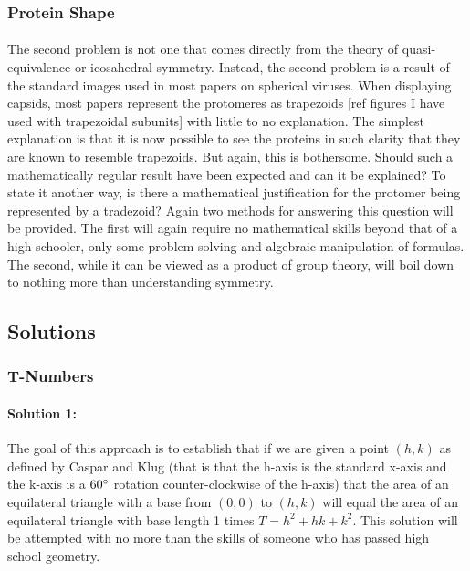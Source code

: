 \documentclass[12pt,letter]{article}
\begin{document}
\subsubsection{Protein Shape}
\paragraph{}
The second problem is not one that comes directly from the theory of quasi-equivalence or icosahedral symmetry. Instead, the second problem is a result of the standard images used in most papers on spherical viruses. When displaying capsids, most papers represent the protomeres as trapezoids [ref figures I have used with trapezoidal subunits] with little to no explanation. The simplest explanation is that it is now possible to see the proteins in such clarity that they are known to resemble trapezoids. But again, this is bothersome. Should such a mathematically regular result have been expected and can it be explained? To state it another way, is there a mathematical justification for the protomer being represented by a tradezoid? Again two methods for answering this question will be provided. The first will again require no mathematical skills beyond that of a high-schooler, only some problem solving and algebraic manipulation of formulas. The second, while it can be viewed as a product of group theory, will boil down to nothing more than understanding symmetry.

\subsection{Solutions}

\subsubsection{T-Numbers}
\paragraph{Solution 1:}
The goal of this approach is to establish that if we are given a point $(h,k)$ as defined by Caspar and Klug (that is that the h-axis is the standard x-axis and the k-axis is a $60\degree$ rotation counter-clockwise of the h-axis) that the area of an equilateral triangle with a base from $(0,0)$ to $(h,k)$ will equal the area of an equilateral triangle with base length 1 times $T = h^2 + hk + k^2$. This solution will be attempted with no more than the skills of someone who has passed high school geometry.
\end{document}
